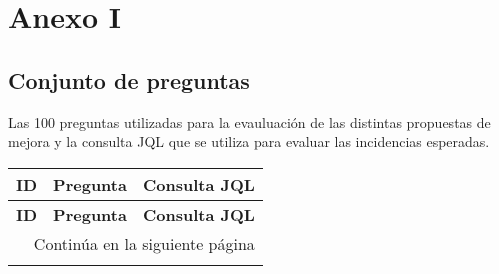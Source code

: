 \section{Anexo I}

\subsection{Conjunto de preguntas}
Las 100 preguntas utilizadas para la evauluación de las distintas propuestas de mejora y la consulta JQL que se utiliza para evaluar las incidencias esperadas.

\begin{center}
    \begin{longtable}{ | p{1cm} | p{8cm} | p{6cm} | }
        \hline
        \textbf{ID} & \textbf{Pregunta} & \textbf{Consulta JQL} \\
        \hline
        \endfirsthead

        \hline
        \textbf{ID} & \textbf{Pregunta} & \textbf{Consulta JQL} \\
        \hline
        \endhead

        \hline
        \multicolumn{3}{|r|}{Continúa en la siguiente página} \\
        \hline
        \endfoot

        \hline
        \endlastfoot


\end{longtable}
\end{center}
